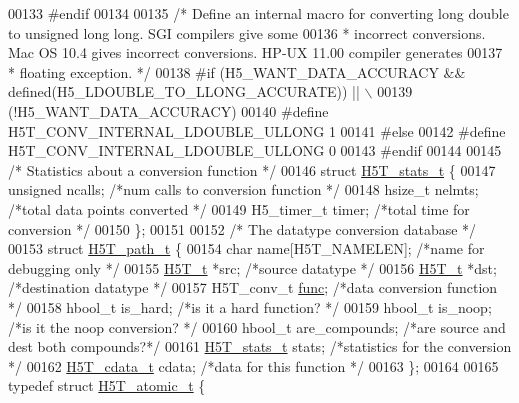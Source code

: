 \begin{DoxyCode}
00133 \textcolor{preprocessor}{#endif}
00134 
00135 \textcolor{comment}{/* Define an internal macro for converting long double to unsigned long long.  SGI compilers give some}
00136 \textcolor{comment}{ * incorrect conversions.  Mac OS 10.4 gives incorrect conversions. HP-UX 11.00 compiler generates}
00137 \textcolor{comment}{ * floating exception. */}
00138 \textcolor{preprocessor}{#if (H5\_WANT\_DATA\_ACCURACY && defined(H5\_LDOUBLE\_TO\_LLONG\_ACCURATE)) || \(\backslash\)}
00139 \textcolor{preprocessor}{    (!H5\_WANT\_DATA\_ACCURACY)}
00140 \textcolor{preprocessor}{#define H5T\_CONV\_INTERNAL\_LDOUBLE\_ULLONG         1}
00141 \textcolor{preprocessor}{#else}
00142 \textcolor{preprocessor}{#define H5T\_CONV\_INTERNAL\_LDOUBLE\_ULLONG         0}
00143 \textcolor{preprocessor}{#endif}
00144 
00145 \textcolor{comment}{/* Statistics about a conversion function */}
00146 \textcolor{keyword}{struct }\hyperlink{struct_h5_t__stats__t}{H5T\_stats\_t} \{
00147     \textcolor{keywordtype}{unsigned}    ncalls;         \textcolor{comment}{/*num calls to conversion function   */}
00148     hsize\_t nelmts;         \textcolor{comment}{/*total data points converted        */}
00149     H5\_timer\_t  timer;          \textcolor{comment}{/*total time for conversion      */}
00150 \};
00151 
00152 \textcolor{comment}{/* The datatype conversion database */}
00153 \textcolor{keyword}{struct }\hyperlink{struct_h5_t__path__t}{H5T\_path\_t} \{
00154     \textcolor{keywordtype}{char}    name[H5T\_NAMELEN];  \textcolor{comment}{/*name for debugging only        */}
00155     \hyperlink{struct_h5_t__t}{H5T\_t}  *src;           \textcolor{comment}{/*source datatype            */}
00156     \hyperlink{struct_h5_t__t}{H5T\_t}  *dst;           \textcolor{comment}{/*destination datatype           */}
00157     H5T\_conv\_t  \hyperlink{structfunc}{func};           \textcolor{comment}{/*data conversion function       */}
00158     hbool\_t is\_hard;        \textcolor{comment}{/*is it a hard function?         */}
00159     hbool\_t is\_noop;        \textcolor{comment}{/*is it the noop conversion?         */}
00160     hbool\_t are\_compounds;      \textcolor{comment}{/*are source and dest both compounds?*/}
00161     \hyperlink{struct_h5_t__stats__t}{H5T\_stats\_t}  stats;          \textcolor{comment}{/*statistics for the conversion      */}
00162     \hyperlink{struct_h5_t__cdata__t}{H5T\_cdata\_t}  cdata;          \textcolor{comment}{/*data for this function         */}
00163 \};
00164 
00165 \textcolor{keyword}{typedef} \textcolor{keyword}{struct }\hyperlink{struct_h5_t__atomic__t}{H5T\_atomic\_t} \{

\end{DoxyCode}
